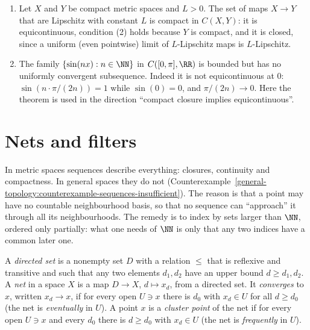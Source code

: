 \begin{example}\label{general-topology:example-arzela-ascoli}
\begin{enumerate}
\item Let $X$ and $Y$ be compact metric spaces and $L > 0$. The set of maps $X \to Y$ that are Lipschitz with constant $L$ is compact in $C(X, Y)$: it is equicontinuous, condition (2) holds because
$Y$ is compact, and it is closed, since a uniform (even pointwise) limit of $L$-Lipschitz maps is $L$-Lipschitz.
\item The family $\{\sin(nx) : n \in \NN\}$ in $C([0, \pi], \RR)$ is bounded but has no uniformly convergent subsequence. Indeed it is not equicontinuous at $0$: $\sin(n \cdot \pi/(2n)) = 1$ while
$\sin(0) = 0$, and $\pi/(2n) \to 0$. Here the theorem is used in the direction ``compact closure implies equicontinuous''.
\end{enumerate}
\end{example}

\section{Nets and filters}\label{general-topology:section-nets}

In metric spaces sequences describe everything: closures, continuity and compactness. In general spaces they do not
(Counterexample~\ref{general-topology:counterexample-sequences-insufficient}). The reason is that a point may have no countable neighbourhood basis, so that no sequence can ``approach'' it
through all its neighbourhoods. The remedy is to index by sets larger than $\NN$, ordered only partially: what one needs of $\NN$ is only that any two indices have a common later one.

\begin{definition}\label{general-topology:definition-net}
A \emph{directed set} is a nonempty set $D$ with a relation $\leq$ that is reflexive and transitive and such that any two elements $d_1, d_2$ have an upper bound $d \geq d_1, d_2$. A \emph{net} in a
space $X$ is a map $D \to X$, $d \mapsto x_d$, from a directed set. It \emph{converges} to $x$, written $x_d \to x$, if for every open $U \ni x$ there is $d_0$ with $x_d \in U$ for all $d \geq d_0$
(the net is \emph{eventually} in $U$). A point $x$ is a \emph{cluster point} of the net if for every open $U \ni x$ and every $d_0$ there is $d \geq d_0$ with $x_d \in U$ (the net is \emph{frequently} in $U$).
\end{definition}

